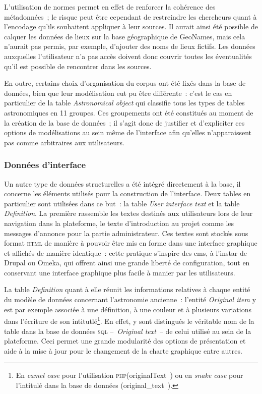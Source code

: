 \documentclass[a4paper,12pt,twoside]{book}
\newcommand{\eng}{\emph}
\newcommand{\Oi}{\eng{Original item}\xspace}
\newcommand{\html}{\textsc{html}\xspace}
\newcommand{\php}{\textsc{php}\xspace}
\newcommand{\g}[1]{\og#1~\fg}
\newcommand{\cms}{\gls{cms}\xspace}
\begin{document}
L'utilisation de normes permet en effet de renforcer la cohérence des métadonnées~; le risque peut être cependant de restreindre les chercheurs quant à l'encodage qu'ils souhaitent appliquer à leur sources. Il aurait ainsi été possible de calquer les données de lieux sur la base géographique de GeoNames, mais cela n'aurait pas permis, par exemple, d'ajouter des noms de lieux fictifs. Les données auxquelles l'utilisateur n'a pas accès doivent donc couvrir toutes les éventualités qu'il est possible de rencontrer dans les sources.

En outre, certains choix d'organisation du corpus ont été fixés dans la base de données, bien que leur modélisation eut pu être différente~: c'est le cas en particulier de la table \eng{Astronomical object} qui classifie tous les types de tables astronomiques en 11 groupes. Ces groupements ont été constitués au moment de la création de la base de données~; il s'agit donc de justifier et d'expliciter ces options de modélisations au sein même de l'interface afin qu'elles n'apparaissent pas comme arbitraires aux utilisateurs.

			\subsubsection{Données d'interface}
Un autre type de données structurelles a été intégré directement à la base, il concerne les éléments utilisés pour la construction de l'interface. Deux tables en particulier sont utilisées dans ce but~: la table \eng{User interface text} et la table \eng{Definition}. La première rassemble les textes destinés aux utilisateurs lors de leur navigation dans la plateforme, le texte d'introduction au projet comme les messages d'annonce pour la partie administrateur. Ces textes sont stockés sous format \html de manière à pouvoir être mis en forme dans une interface graphique et affichés de manière identique~: cette pratique s'inspire des \cms, à l'instar de Drupal ou Omeka, qui offrent ainsi une grande liberté de configuration, tout en conservant une interface graphique plus facile à manier par les utilisateurs.

La table \eng{Definition} quant à elle réunit les informations relatives à chaque entité du modèle de données concernant l'astronomie ancienne~: l'entité \Oi y est par exemple associée à une définition, à une couleur et à plusieurs variations dans l'écriture de son intitutlé\footnote{En \eng{camel case} pour l'utilisation \php (\g{originalText}) ou en \eng{snake case} pour l'intitulé dans la base de données (\g{original\_text}).}. En effet, y sont distingués le véritable nom de la table dans la base de données \textsc{sql} –~\eng{Original text}~– de celui utilisé au sein de la plateforme. Ceci permet une grande modularité des options de présentation et aide à la mise à jour pour le changement de la charte graphique entre autres.
\end{document}
